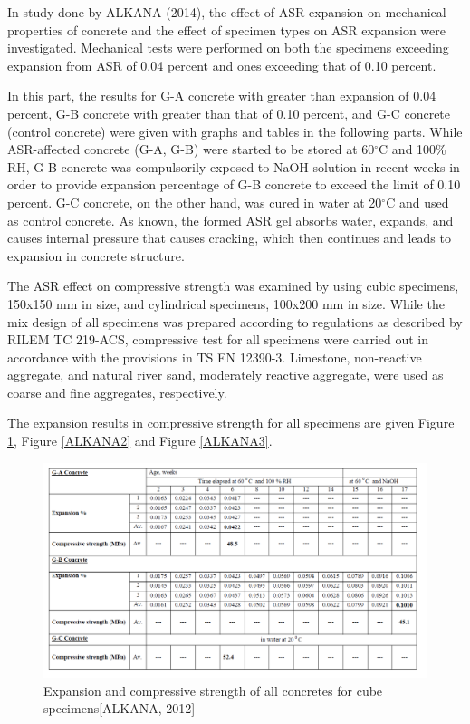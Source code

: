 \clearpage

In study done by ALKANA (2014), the effect of ASR expansion on mechanical properties of concrete and the effect of specimen types on ASR expansion were investigated. Mechanical tests were performed on both the specimens exceeding expansion from ASR of 0.04 percent and ones exceeding that of 0.10 percent.

In this part, the results for G-A concrete with greater than expansion of 0.04 percent, G-B concrete with greater than that of 0.10 percent, and G-C concrete (control concrete) were given with graphs and tables in the following parts. While ASR-affected concrete (G-A, G-B) were started to be stored at 60$^\circ$C and 100\% RH, G-B concrete was compulsorily exposed to NaOH solution in recent weeks in order to provide expansion percentage of G-B concrete to exceed the limit of 0.10 percent. G-C concrete, on the other hand, was cured in water at 20$^\circ$C and used as control concrete. As known, the formed ASR gel absorbs water, expands, and causes internal pressure that causes cracking, which then continues and leads to expansion in concrete structure.



The ASR effect on compressive strength was examined by using cubic specimens, 150x150 mm in size, and cylindrical specimens, 100x200 mm in size. While the mix design of all specimens was prepared according to regulations as described by RILEM TC 219-ACS, compressive test for all specimens were carried out in accordance with the provisions in TS EN 12390-3. Limestone, non-reactive aggregate, and natural river sand, moderately reactive aggregate, were used as coarse and fine aggregates, respectively.

The expansion results in compressive strength for all specimens are given Figure \ref{ALKANA1}, Figure \ref{ALKANA2} and Figure \ref{ALKANA3}.

\begin{figure}[h!]
  \centering
  \includegraphics[width=1.0\linewidth]{Reference/ALKANASR1.png}
  \caption{Expansion and compressive strength of all concretes for cube specimens[ALKANA, 2012]}
  \label{ALKANA1}
\end{figure}

